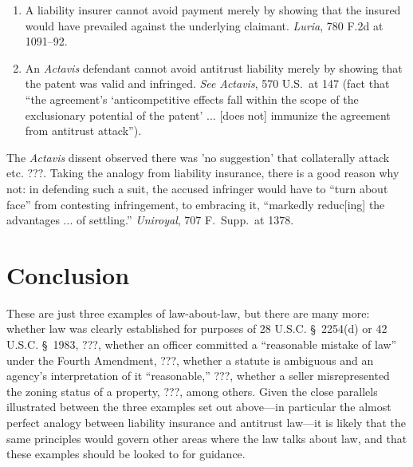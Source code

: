 \documentclass[
  12pt,
  letterpaper,
]{scrartcl}
\begin{document}
\begin{enumerate}
  \item A liability insurer cannot avoid payment merely by showing that the
    insured would have prevailed against the underlying claimant.
    \textit{Luria}, 780 F.2d at 1091--92.
  \item An \textit{Actavis} defendant cannot avoid antitrust liability merely
    by showing that the patent was valid and infringed. \textit{See}
    \textit{Actavis}, 570 U.S.~at 147 (fact that ``the agreement's
    `anticompetitive effects fall within the scope of the exclusionary
    potential of the patent' ... [does not] immunize the agreement from
    antitrust attack'').
\end{enumerate}

The \textit{Actavis} dissent observed there was 'no suggestion' that
collaterally attack etc. ???. Taking the analogy from liability insurance,
there is a good reason why not: in defending such a suit, the accused infringer
would have to ``turn about face'' from contesting infringement, to embracing
it, ``markedly reduc[ing] the advantages ... of settling.'' \textit{Uniroyal},
707 F.~Supp.~at 1378.


\section{Conclusion}

These are just three examples of law-about-law, but there are many more:
whether law was clearly established for purposes of 28 U.S.C. § 2254(d) or 42
U.S.C. § 1983, ???, whether an officer committed a ``reasonable mistake of
law'' under the Fourth Amendment, ???, whether a statute is ambiguous and an
agency's interpretation of it ``reasonable,'' ???, whether a seller
misrepresented the zoning status of a property, ???, among others. Given the
close parallels illustrated between the three examples set out above---in
particular the almost perfect analogy between liability insurance and antitrust
law---it is likely that the same principles would govern other areas where the
law talks about law, and that these examples should be looked to for guidance.
\end{document}
